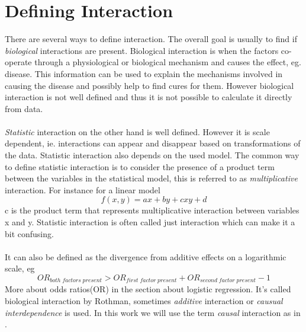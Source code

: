 \documentclass[10pt,a4paper]{report}
\begin{document}

\section{Defining Interaction}
There are several ways to define interaction. The overall goal is usually to find if \emph{biological} interactions are present. Biological interaction is when the factors co-operate through a physiological or biological mechanism and causes the effect, eg. disease. This information can be used to explain the mechanisms involved in causing the disease and possibly help to find cures for them. However biological interaction is not well defined and thus it is not possible to calculate it directly from data.\cite{rothman1998modern,rothman2002intro_epidemiology}\\
\\
\emph{Statistic} interaction on the other hand is well defined. However it is scale dependent, ie. interactions can appear and disappear based on transformations of the data. Statistic interaction also depends on the used model. The common way to define statistic interaction is to consider the presence of a product term between the variables in the statistical model, this is referred to as \emph{multiplicative} interaction. For instance for a linear model
$$f(x,y)=ax+by+cxy+d$$
c is the product term that represents multiplicative interaction between variables x and y. Statistic interaction is often called just interaction which can make it a bit confusing.\cite{geira,rothman1998modern}\\
\\
It can also be defined as the divergence from additive effects on a logarithmic scale, eg
$$OR_{both\;factors\;present}>OR_{first\;factor\;present}+OR_{second\;factor\;present}-1$$
More about odds ratios(OR) in the section about logistic regression. It's called biological interaction by Rothman\cite{rothman1998modern}, sometimes \emph{additive} interaction\cite{geira} or \emph{causual interdependence}\cite{greenland1988invariants} is used. In this work we will use the term \emph{causal} interaction as in \cite{causal_bounds_arvid}.\\
\end{document}
